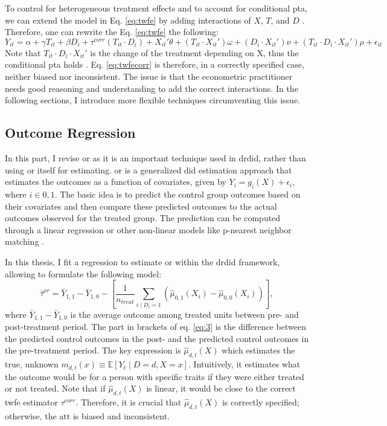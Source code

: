 To control for heterogeneous treatment effects and to account for conditional \ac{pta}, we can extend the model in Eq. \ref{eq:twfe} by adding interactions of $X$, $T$, and $D$ \citep[see][]{manfeDifferenceInDifferenceDesignRepeated, hansen2022econometrics}.
Therefore, one can rewrite the Eq. \ref{eq:twfe} the following:
\begin{equation}
    Y_{it} = \alpha + \gamma T_{it} + \beta D_{i} + \tau^{corr} (T_{it} \cdot D_{i}) + X_{it}' \theta + (T_{it} \cdot X_{it}') \omega + (D_{i} \cdot X_{it}') \nu + (T_{it} \cdot D_{i} \cdot X_{it}') \rho + \epsilon_{it}
    \label{eq:twfecorr}
\end{equation}
Note that $T_{it} \cdot D_{i} \cdot X_{it}'$ is the change of the treatment depending on X, thus the conditional \ac{pta} holds \citep{manfeDifferenceInDifferenceDesignRepeated}.
Eq. \ref{eq:twfecorr} is therefore, in a correctly specified case, neither biased nor inconsistent.
The issue is that the econometric practitioner needs good reasoning and understanding to add the correct interactions.
In the following sections, I introduce more flexible techniques circumventing this issue.

\subsection{Outcome Regression}
In this part, I revise \ac{or} as it is an important technique used in \ac{drdid}, rather than using \ac{or} itself for estimating.
\ac{or} is a generalized \ac{did} estimation approach that estimates the outcomes as a function of covariates, given by $Y_i = g_i(X) + \epsilon_i$, where $i \in 0,1$.
The basic idea is to predict the control group outcomes based on their covariates and then compare these predicted outcomes to the actual outcomes observed for the treated group.
The prediction can be computed through a linear regression or other non-linear models like p-nearest neighbor matching \parencite{heckmanMatchingEconometricEvaluation1998}.

In this thesis, I fit a regression to estimate \ac{or} within the \ac{drdid} framework, allowing to formulate the following model:
\begin{equation}
\hat{\tau}^{or} = \bar{Y}_{1,1} - \bar{Y}_{1,0} - \left[ \frac{1}{n_{treat}} \sum_{i \mid D_i = 1} \left( \hat{\mu}_{0,1}(X_i) - \hat{\mu}_{0,0}(X_i) \right) \right],
\label{eq:3}
\end{equation}
where $\bar{Y}_{1,1} - \bar{Y}_{1,0}$ is the average outcome among treated units between pre- and post-treatment period.
The part in brackets of eq. \ref{eq:3} is the difference between the predicted control outcomes in the post- and the predicted control outcomes in the pre-treatment period.
The key expression is $\hat{\mu}_{d,t}(X)$ which estimates the true, unknown $m_{d,t}(x) \equiv \mathbb{E}[Y_t \mid D = d, X = x]$.
Intuitively, it estimates what the outcome would be for a person with specific traits if they were either treated or not treated.
Note that if $\hat{\mu}_{d,t}(X)$ is linear, it would be close to the correct \ac{twfe} estimator $\tau^{corr}$.
Therefore, it is crucial that $\hat{\mu}_{d,t}(X)$ is correctly specified; otherwise, the \ac{att} is biased and inconsistent.

